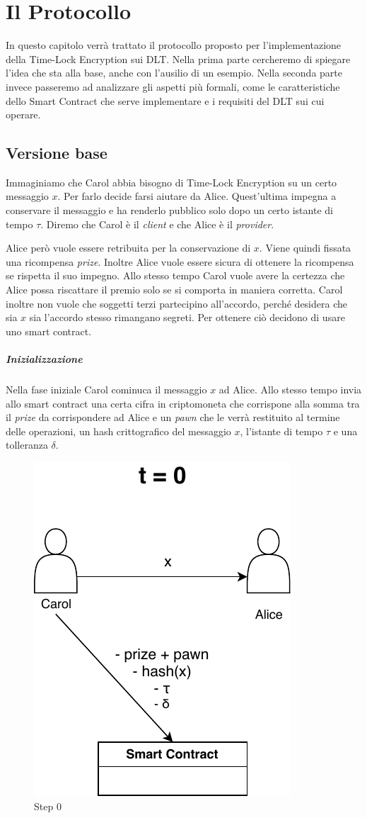 \chapter{Il Protocollo}
\label{chap:protocollo}

In questo capitolo verrà trattato il protocollo proposto per l'implementazione
della Time-Lock Encryption sui DLT. Nella prima parte cercheremo di spiegare
l'idea che sta alla base, anche con l'ausilio di un esempio. Nella seconda parte
invece passeremo ad analizzare gli aspetti più formali, come le caratteristiche
dello Smart Contract che
serve implementare e i requisiti del DLT sui cui operare.

\section{Versione base}
\label{sec:versione-base}
Immaginiamo che Carol abbia bisogno di Time-Lock Encryption su un certo messaggio $ x $.
Per farlo decide farsi aiutare da Alice. Quest'ultima
impegna a conservare il messaggio e ha renderlo pubblico solo dopo un
certo istante di tempo $ \tau $.
Diremo che Carol è il \textit{client} e che Alice è il \textit{provider}.

Alice però vuole essere retribuita per la conservazione di $ x $. Viene quindi fissata
una ricompensa \textit{prize}. Inoltre Alice vuole essere sicura di
ottenere la ricompensa se rispetta il suo impegno. Allo stesso tempo Carol
vuole avere la certezza che Alice possa riscattare il premio solo se si comporta
in maniera corretta.
Carol inoltre non vuole che soggetti terzi partecipino all'accordo, perché desidera
che sia $ x $ sia l'accordo stesso rimangano segreti.
Per ottenere ciò decidono di usare uno smart contract.

\paragraph{Inizializzazione}
Nella fase iniziale Carol cominuca il messaggio $ x $ ad Alice. Allo stesso tempo invia
allo smart contract una certa cifra in criptomoneta
che corrispone alla somma tra il \textit{prize} da corrispondere ad Alice e un
\textit{pawn} che le verrà restituito al termine delle operazioni, un hash
crittografico del messaggio $ x $, l'istante di tempo $ \tau $ e una tolleranza $ \delta $.
\begin{figure}[H]
	\centering
	\includegraphics[width=0.3\linewidth]{images/chap_protocollo/base-creazione.pdf}
	\caption{Step 0}
\end{figure}


